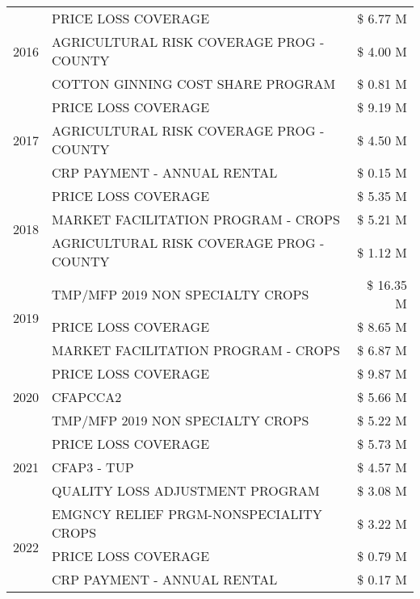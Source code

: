 \begin{tabular}{llr}
\cline{1-3}
\multirow[t]{3}{*}{2016} & PRICE LOSS COVERAGE & \$ 6.77 M \\
 & AGRICULTURAL RISK COVERAGE PROG - COUNTY & \$ 4.00 M \\
 & COTTON GINNING COST SHARE PROGRAM & \$ 0.81 M \\
\cline{1-3}
\multirow[t]{3}{*}{2017} & PRICE LOSS COVERAGE & \$ 9.19 M \\
 & AGRICULTURAL RISK COVERAGE PROG - COUNTY & \$ 4.50 M \\
 & CRP PAYMENT - ANNUAL RENTAL & \$ 0.15 M \\
\cline{1-3}
\multirow[t]{3}{*}{2018} & PRICE LOSS COVERAGE & \$ 5.35 M \\
 & MARKET FACILITATION PROGRAM - CROPS & \$ 5.21 M \\
 & AGRICULTURAL RISK COVERAGE PROG - COUNTY & \$ 1.12 M \\
\cline{1-3}
\multirow[t]{3}{*}{2019} & TMP/MFP 2019 NON SPECIALTY CROPS & \$ 16.35 M \\
 & PRICE LOSS COVERAGE & \$ 8.65 M \\
 & MARKET FACILITATION PROGRAM - CROPS & \$ 6.87 M \\
\cline{1-3}
\multirow[t]{3}{*}{2020} & PRICE LOSS COVERAGE & \$ 9.87 M \\
 & CFAPCCA2 & \$ 5.66 M \\
 & TMP/MFP 2019 NON SPECIALTY CROPS & \$ 5.22 M \\
\cline{1-3}
\multirow[t]{3}{*}{2021} & PRICE LOSS COVERAGE & \$ 5.73 M \\
 & CFAP3 - TUP & \$ 4.57 M \\
 & QUALITY LOSS ADJUSTMENT PROGRAM & \$ 3.08 M \\
\cline{1-3}
\multirow[t]{3}{*}{2022} & EMGNCY RELIEF PRGM-NONSPECIALITY CROPS & \$ 3.22 M \\
 & PRICE LOSS COVERAGE & \$ 0.79 M \\
 & CRP PAYMENT - ANNUAL RENTAL & \$ 0.17 M \\
\cline{1-3}
\bottomrule
\end{tabular}
